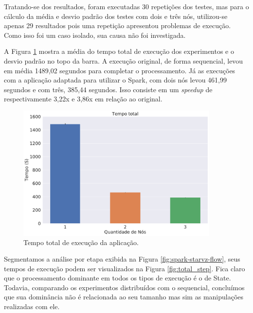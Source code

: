 Tratando-se dos resultados, foram executadas 30 repetições dos testes, mas para 
o cálculo da média e desvio padrão dos testes com dois e três nós, utilizou-se 
apenas 29 resultados pois uma repetição apresentou problemas de execução. Como 
isso foi um caso isolado, sua causa não foi investigada.

A Figura \ref{fig:total_full} mostra a média do tempo total de execução dos 
experimentos e o desvio padrão no topo da barra. A execução original, de forma 
sequencial, levou em média 1489,02 segundos para completar o processamento. Já 
as execuções com a aplicação adaptada para utilizar o Spark, com dois nós levou 
461,99 segundos e com três, 385,44 segundos. Isso consiste em um \emph{speedup} 
de respectivamente 3,22x e 3,86x em relação ao original.


\begin{figure}[H]
\centerline{
\includegraphics[width=0.9\textwidth]{./img/total.pdf}}
 \caption{Tempo total de execução da aplicação.}
 \label{fig:total_full}
\end{figure}

Segmentamos a análise por etapa exibida na Figura \ref{fig:spark-starvz-flow}, 
seus tempos de execução podem ser visualizados na Figura \ref{fig:total_step}. 
Fica claro que o processamento dominante em todos os tipos de execução é o de 
State. Todavia, comparando os experimentos distribuídos com o sequencial, 
concluímos que sua dominância não é relacionada ao seu tamanho mas sim as 
manipulações realizadas com ele.

